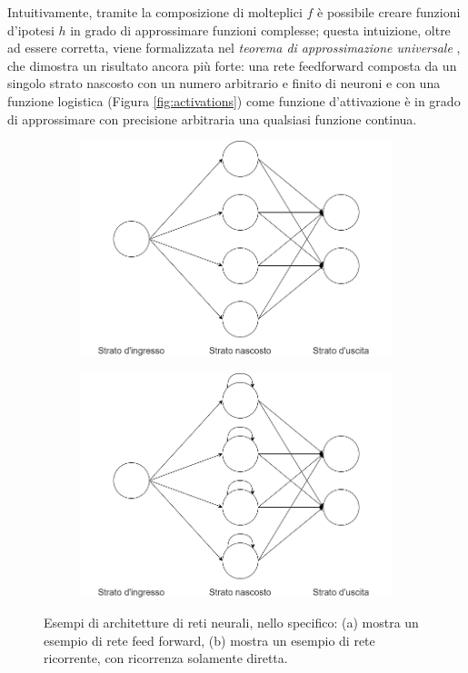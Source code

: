 \documentclass[../../main.tex]{subfiles}
\begin{document}
Intuitivamente, tramite la composizione di molteplici $f$ è possibile creare funzioni d'ipotesi $h$ in grado di approssimare funzioni complesse; questa intuizione, oltre ad essere corretta, viene formalizzata nel \textit{teorema di approssimazione universale} \cite{journals/mcss/Cybenko89}, che dimostra un risultato ancora più forte: una rete feedforward composta da un singolo strato nascosto con un numero arbitrario e finito di neuroni e con una funzione logistica (Figura \ref{fig:activations}) come funzione d'attivazione è in grado di approssimare con precisione arbitraria una qualsiasi funzione continua.

\begin{figure}[H]
    \begin{subfigure}[b]{0.48\textwidth}
        \centering
        \includegraphics[width = \textwidth]{immagini/4_2/feed_forward.png}
        \caption{}
        \label{fig:feedforward}        
    \end{subfigure}
    \begin{subfigure}[b]{0.48\textwidth}
        \centering
        \includegraphics[width = \textwidth]{immagini/4_2/RNN.png}
        \caption{}
        \label{fig:RNN}
    \end{subfigure}
    \caption{Esempi di architetture di reti neurali, nello specifico: (a) mostra un esempio di rete feed forward, (b) mostra un esempio di rete ricorrente, con ricorrenza solamente diretta.}
\end{figure}
\end{document}

